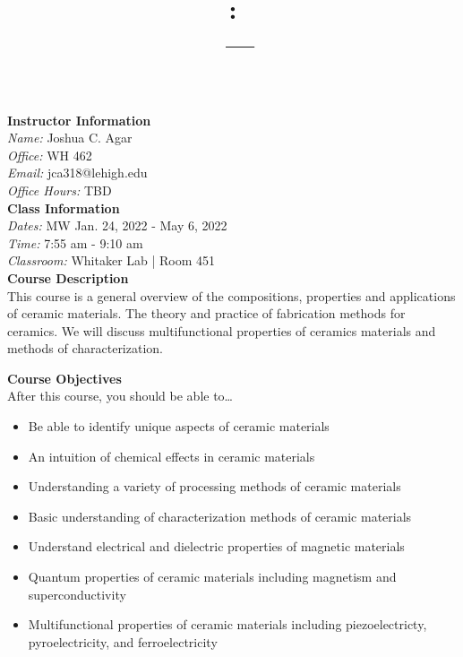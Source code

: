 \documentclass[11pt,letterpaper]{article}
\title{\Large\bfseries \coursecode: \coursetitle \\[0.1cm] \coursesection\ --- \semester}
\author{}
\date{}
\makeatletter
\newcommand{\lefthead}[2]{\noindent\textbf{#1}\hfill\\[#2]}
\newcommand{\instructor}{Joshua C. Agar}
\newcommand{\office}{WH 462}
\newcommand{\email}{jca318@lehigh.edu}
\newcommand{\officehours}{TBD}
\newcommand{\coursesupervisor}{SUPERVISOR}
\newcommand{\classdates}{MW Jan. 24, 2022 - May 6, 2022}
\newcommand{\classtime}{7:55 am - 9:10 am}
\newcommand{\classroom}{Whitaker Lab | Room 451}
\makeatother
\begin{document}
\maketitle
\thispagestyle{empty}
\vspace{-2cm}


\lefthead{Instructor Information}{0.3cm}
\indent \emph{Name:} \instructor \\
\indent \emph{Office:} \office \\
\indent \emph{Email:} \email \\
\indent \emph{Office Hours:} \officehours \\


\lefthead{Class Information}{0.3cm}
\indent \emph{Dates: } \classdates \\
\indent \emph{Time: } \classtime \\
\indent \emph{Classroom: } \classroom \\[0.3cm]





\lefthead{Course Description}{0.3cm}
\noindent This course is a general overview of the compositions, properties and applications of ceramic materials. The theory and practice of fabrication methods for ceramics. We will discuss multifunctional properties of ceramics materials and methods of characterization.\newline


\lefthead{Course Objectives}{0.3cm}
After this course, you should be able to\dots
        \begin{itemize}
        \item Be able to identify unique aspects of ceramic materials
        \item An intuition of chemical effects in ceramic materials
        \item Understanding a variety of processing methods of ceramic materials
        \item Basic understanding of characterization methods of ceramic materials
        \item Understand electrical and dielectric properties of magnetic materials
        \item Quantum properties of ceramic materials including magnetism and superconductivity
        \item Multifunctional properties of ceramic materials including piezoelectricty, pyroelectricity, and ferroelectricity
        \end{itemize} \vspace{0.3cm}
\end{document}
